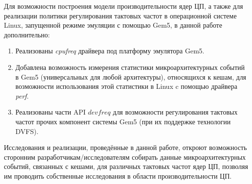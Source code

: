 
    Для возможности построения модели производительности ядер ЦП, а также для реализации политики
    регулирования тактовых частот в операционной системе Linux, запущенной режиме эмуляции с
    помощью Gem5, в данной работе дополнительно:
    \begin{enumerate}
        \item Реализованы \textit{cpufreq} драйвера под платформу эмулятора Gem5.
        \item Добавлена возможность измерения статистики микроархитектурных событий в Gem5
        (универсальных для любой архитектуры), относящихся к кешам, для возможности использования
        этой статистики в Linux c помощью драйвера \textit{perf}.
        \item Реализованы части API $devfreq$ для возможности регулирования
        тактовых частот прочих компонент системы Gem5 (при их поддержке технологии DVFS).
    \end{enumerate}

    Исследования и реализации, проведённые в данной работе, откроют возможность сторонним
    разработчикам/исследователям собирать данные микроархитектурных событий, связанных с кешами,
    для различных тактовых частот ядер ЦП, позволяя им проводить собственные исследования в области
    производительности ЦП.

\newpage
